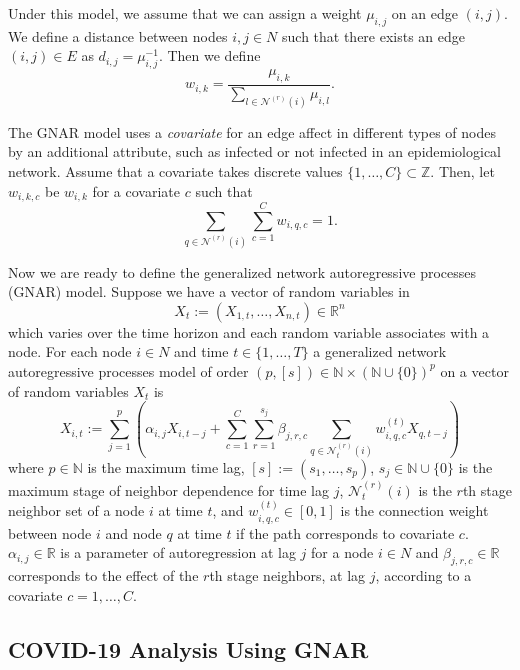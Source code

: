 Under this model, we assume that we can assign a weight $\mu_{i, j}$ on an edge $(i, j)$.  We define a distance between nodes $i, j \in N$ such that there exists an edge $(i, j) \in E$ as $d_{i, j} = \mu_{i, j}^{-1}$.  Then we define  
\begin{equation}\label{eq:normalizedwt}
    w_{i, k} =\frac{\mu_{i, k}}{\sum\limits_{l \in \mathcal{N}^{(r)}(i)} \mu_{i, l}}.
\end{equation}

The GNAR model uses a {\em covariate} for an edge affect in different types of nodes by an additional attribute, such as infected or not infected in an epidemiological network. 
Assume that a covariate takes discrete values $\{1, \ldots , C\} \subset \mathbb{Z}$.  Then, let $w_{i, k, c}$ be $w_{i, k}$ for a covariate $c$ such that 
\[
\sum_{q \in \mathcal{N}^{(r)}(i)}\sum_{c = 1}^C w_{i, q, c} = 1.
\]

Now we are ready to define the generalized network autoregressive processes (GNAR) model.  Suppose we have a vector of random variables in 
\[
X_t := (X_{1, t}, \ldots , X_{n, t}) \in \mathbb{R}^n
\]
which varies over the time horizon and each random variable associates with a node.
For each node $i \in N$ and time $t \in \{1, \ldots , T\}$ a generalized network autoregressive processes model of order $(p, [s]) \in \mathbb{N} \times (\mathbb{N}\cup \{0\})^p$ on a vector of random variables $X_t$ is
\begin{equation}\label{eq:gnar}
    X_{i, t}:= \sum_{j = 1}^p \left(\alpha_{i, j}X_{i, t-j} + \sum_{c = 1}^C\sum_{r = 1}^{s_j}\beta_{j, r, c} \sum_{q \in \mathcal{N}_t^{(r)}(i)} w_{i, q, c}^{(t)}X_{q, t-j}\right)
\end{equation}
where $p \in \mathbb{N}$ is the maximum time lag, $[s]:= (s_1, \ldots , s_p)$, $s_j \in \mathbb{N} \cup \{0\}$ is the maximum stage of neighbor dependence for time lag $j$, $\mathcal{N}_t^{(r)}(i)$ is the $r$th stage neighbor set of a node $i$ at time $t$, and  $w_{i, q, c}^{(t)} \in [0, 1]$ is the connection weight between node $i$ and node $q$ at time $t$ if the path corresponds to covariate $c$. $\alpha_{i, j} \in \mathbb{R}$ is a parameter of autoregression at lag $j$ for a node $i \in N$ and $\beta_{j, r, c} \in \mathbb{R}$ corresponds to the effect of the $r$th stage neighbors, at lag $j$,
according to a covariate $c = 1, \ldots , C$.  

\subsection{COVID-19 Analysis Using GNAR}

